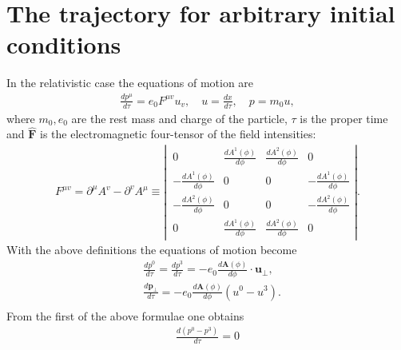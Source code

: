\section[The trajectory for arbitrary initial conditions]{The trajectory for arbitrary initial conditions}
In the relativistic case the equations of motion are
\begin{align}
  \frac{d p^{\mu}}{d \tau}=e_{0} F^{\mu v} u_{v}, \quad u=\frac{d x}{d \tau}, \quad p=m_{0} u, \label{II.2.3.1}
\end{align}
where $m_{0}, e_{0}$ are the rest mass and charge of the particle, $\tau$ is the proper time and $\hat{\mathbf{F}}$ is the electromagnetic four-tensor of the field intensities:
\begin{align}
  F^{\mu v}=\partial^{\mu} A^{v}-\partial^{v} A^{\mu} \equiv \left\lvert\, \begin{array}{cccc}
                                                                             0                             & \frac{d A^{1}(\phi)}{d \phi} & \frac{d A^{2}(\phi)}{d \phi} & 0                             \\
                                                                             -\frac{d A^{1}(\phi)}{d \phi} & 0                            & 0                            & -\frac{d A^{1}(\phi)}{d \phi} \\
                                                                             -\frac{d A^{2}(\phi)}{d \phi} & 0                            & 0                            & -\frac{d A^{2}(\phi)}{d \phi} \\
                                                                             0                             & \frac{d A^{1}(\phi)}{d \phi} & \frac{d A^{2}(\phi)}{d \phi} & 0
                                                                           \end{array}\right\rvert . \label{II.2.3.2}
\end{align}
With the above definitions the equations of motion become
\begin{align}
   & \frac{d p^{0}}{d \tau}=\frac{d p^{3}}{d \tau}=-e_{0} \frac{d \mathbf{A}(\phi)}{d \phi} \cdot \mathbf{u}_{\perp},  \label{II.2.3.3} \\
   & \frac{d \mathbf{p}_{\perp}}{d \tau}=-e_{0} \frac{d \mathbf{A}(\phi)}{d \phi}\left(u^{0}-u^{3}\right) . \label{II.2.3.4}            \\
\end{align}
From the first of the above formulae one obtains
\begin{align}
  \frac{d\left(p^{0}-p^{3}\right)}{d \tau}=0 \label{II.2.3.5}
\end{align}
